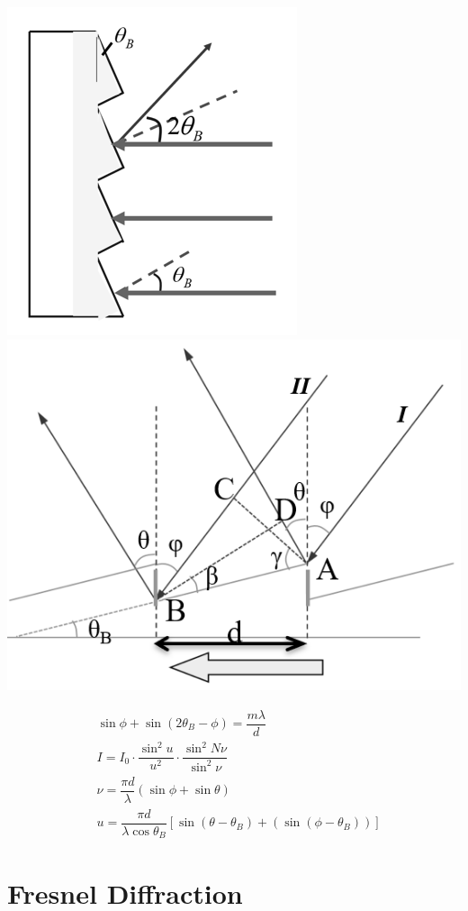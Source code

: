 \begin{minipage}[htbp]{0.6\linewidth}
  \includegraphics[width=0.4\linewidth]{figures/blazed-grating.png}
  \includegraphics[width=0.6\linewidth]{figures/blazed-grating-1.png}
\end{minipage}
\begin{minipage}[htbp]{0.4\linewidth}
  \begin{equation*}
    \begin{aligned}
      & \sin \phi + \sin \left( 2 \theta_B - \phi \right) = \dfrac{m\lambda}{d} \\
      & I = I_0 \cdot \dfrac{\sin^2 u}{u^2} \cdot \dfrac{\sin^2 N \nu}{\sin^2 \nu} \\
      & \nu = \dfrac{\pi d}{\lambda} \left( \sin \phi + \sin \theta \right) \\
      & u = \dfrac{\pi d}{\lambda \cos \theta_B} \left[ \sin \left( \theta - \theta_B \right) + \left( \sin \left( \phi - \theta_B \right) \right) \right] 
    \end{aligned}
  \end{equation*}
\end{minipage}

\section{Fresnel Diffraction}

